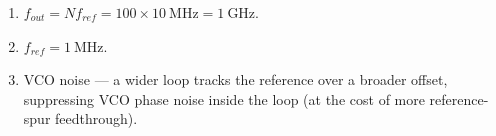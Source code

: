 \begin{enumerate}[leftmargin=1.6em,itemsep=2pt]
\item $f_{out} = N f_{ref} = 100\times10\ \text{MHz} = 1\ \text{GHz}$.
\item $f_{ref} = 1\ \text{MHz}$.
\item VCO noise --- a wider loop tracks the reference over a broader offset, suppressing VCO phase noise inside the loop (at the cost of more reference-spur feedthrough).
\end{enumerate}
